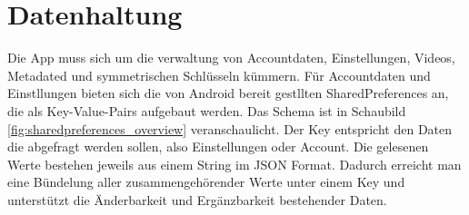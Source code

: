 \section{Datenhaltung}
Die App muss sich um die verwaltung von Accountdaten, Einstellungen, Videos, Metadated und symmetrischen Schlüsseln kümmern. Für Accountdaten und  Einstllungen bieten sich die von Android bereit gestllten SharedPreferences an, die als Key-Value-Pairs aufgebaut werden. Das Schema ist in Schaubild \ref{fig:sharedpreferences_overview} veranschaulicht. Der Key entspricht den Daten die abgefragt werden sollen, also Einstellungen oder Account. Die gelesenen Werte bestehen jeweils aus einem String im JSON Format. Dadurch erreicht man eine Bündelung aller zusammengehörender Werte unter einem Key und unterstützt die Änderbarkeit und Ergänzbarkeit bestehender Daten.\newline\par

